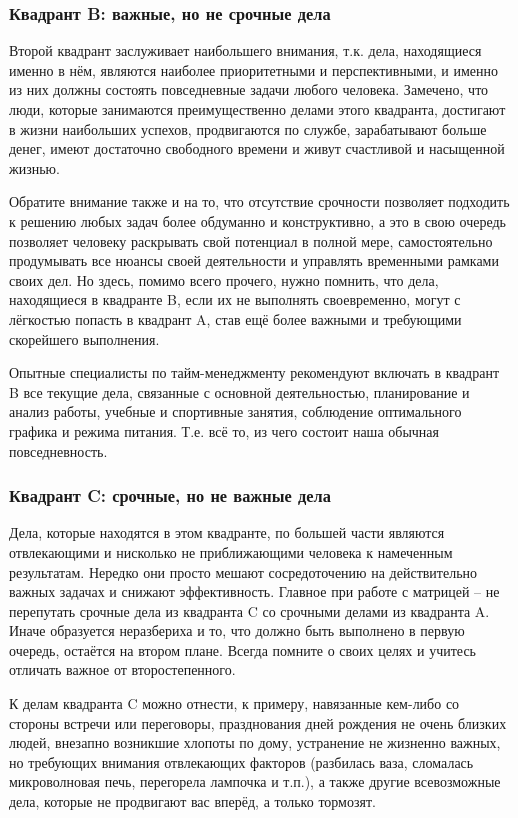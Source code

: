 \subsubsection{Квадрант B: важные, но не срочные дела }


Второй квадрант заслуживает наибольшего внимания, т.к. дела, находящиеся именно в нём, являются наиболее приоритетными и перспективными, и именно из них должны состоять повседневные задачи любого человека. Замечено, что люди, которые занимаются преимущественно делами этого квадранта, достигают в жизни наибольших успехов, продвигаются по службе, зарабатывают больше денег, имеют достаточно свободного времени и живут счастливой и насыщенной жизнью.

Обратите внимание также и на то, что отсутствие срочности позволяет подходить к решению любых задач более обдуманно и конструктивно, а это в свою очередь позволяет человеку раскрывать свой потенциал в полной мере, самостоятельно продумывать все нюансы своей деятельности и управлять временными рамками своих дел. Но здесь, помимо всего прочего, нужно помнить, что дела, находящиеся в квадранте B, если их не выполнять своевременно, могут с лёгкостью попасть в квадрант A, став ещё более важными и требующими скорейшего выполнения.

Опытные специалисты по тайм-менеджменту рекомендуют включать в квадрант B все текущие дела, связанные с основной деятельностью, планирование и анализ работы, учебные и спортивные занятия, соблюдение оптимального графика и режима питания. Т.е. всё то, из чего состоит наша обычная повседневность.

\subsubsection{Квадрант C: срочные, но не важные дела }


Дела, которые находятся в этом квадранте, по большей части являются отвлекающими и нисколько не приближающими человека к намеченным результатам. Нередко они просто мешают сосредоточению на действительно важных задачах и снижают эффективность. Главное при работе с матрицей – не перепутать срочные дела из квадранта C со срочными делами из квадранта A. Иначе образуется неразбериха и то, что должно быть выполнено в первую очередь, остаётся на втором плане. Всегда помните о своих целях и учитесь отличать важное от второстепенного.

К делам квадранта C можно отнести, к примеру, навязанные кем-либо со стороны встречи или переговоры, празднования дней рождения не очень близких людей, внезапно возникшие хлопоты по дому, устранение не жизненно важных, но требующих внимания отвлекающих факторов (разбилась ваза, сломалась микроволновая печь, перегорела лампочка и т.п.), а также другие всевозможные дела, которые не продвигают вас вперёд, а только тормозят.

